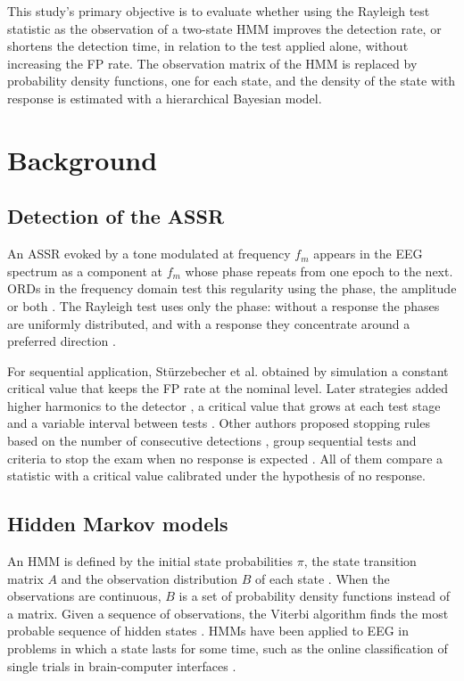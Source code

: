 \documentclass[conference]{IEEEtran}
\begin{document}
This study's primary objective is to evaluate whether using the Rayleigh test statistic as the observation of a two-state HMM improves the detection rate, or shortens the detection time, in relation to the test applied alone, without increasing the FP rate. The observation matrix of the HMM is replaced by probability density functions, one for each state, and the density of the state with response is estimated with a hierarchical Bayesian model.

\section{Background}

\subsection{Detection of the ASSR}

An ASSR evoked by a tone modulated at frequency $f_m$ appears in the EEG spectrum as a component at $f_m$ whose phase repeats from one epoch to the next. ORDs in the frequency domain test this regularity using the phase, the amplitude or both \cite{dobie1993,sturzebecher1999,cebulla2006}. The Rayleigh test uses only the phase: without a response the phases are uniformly distributed, and with a response they concentrate around a preferred direction \cite{mardia2000}.

For sequential application, Stürzebecher et al. \cite{sturzebecher2005} obtained by simulation a constant critical value that keeps the FP rate at the nominal level. Later strategies added higher harmonics to the detector \cite{cebulla2006}, a critical value that grows at each test stage \cite{sturzebecher2013} and a variable interval between tests \cite{cebulla2015}. Other authors proposed stopping rules based on the number of consecutive detections \cite{zanotelli2020}, group sequential tests \cite{chesnaye2020} and criteria to stop the exam when no response is expected \cite{vaz2024}. All of them compare a statistic with a critical value calibrated under the hypothesis of no response.

\subsection{Hidden Markov models}

An HMM is defined by the initial state probabilities $\pi$, the state transition matrix $A$ and the observation distribution $B$ of each state \cite{rabiner1989}. When the observations are continuous, $B$ is a set of probability density functions instead of a matrix. Given a sequence of observations, the Viterbi algorithm finds the most probable sequence of hidden states \cite{viterbi1967}. HMMs have been applied to EEG in problems in which a state lasts for some time, such as the online classification of single trials in brain-computer interfaces \cite{obermaier2001}.
\end{document}
